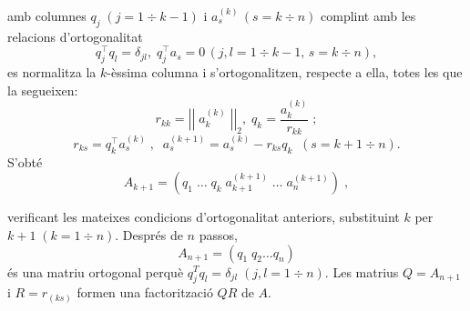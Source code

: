 \documentclass{article}
\begin{document}
amb columnes $q_{j}\;\left(j = 1 \div k - 1  \right)$ i $a_{s}^{(k)}\, \left(s = k \div n \right)$ complint amb les relacions d'ortogonalitat
$$q_{j}^\top q_{l} = \delta_{jl},\; q_{j}^\top a_{s} = 0\, \left(j, l = 1 \div k-1,\, s = k \div n \right),$$
es normalitza la $k$-èssima columna i s'ortogonalitzen, respecte a ella, totes les que la segueixen:
$$r_{kk} = \left| \left|\; a_{k}^{(k)}\; \right| \right|_{2}, \; q_{k} = \frac{a_{k}^{(k)}}{r_{kk}}\;; $$ 
$$r_{ks} = q_{k}^\top a_{s}^{(k)}\; , \; \; a_{s}^{(k+1)} = a_{s}^{(k)} - r_{ks}q_{k} \; \; \left( s = k+1 \div n \right) .$$
S'obté
$$A_{k+1} = \left( q_{1} \; \ldots{} \; q_{k} \; a_{k+1}^{(k+1)} \; \ldots{} \; a_{n}^{(k+1)} \right) \; ,$$

verificant les mateixes condicions d'ortogonalitat anteriors, substituint $k$ per $k+1 \; \left( k = 1 \div n \right).$ \newline
Després de $n$ passos,
$$A_{n+1} = \left(q_{1} \; q_{2} \ldots{} q_{n} \right)$$
és una matriu ortogonal perquè $q_{j}^{T}q_{l} = \delta_{jl} \; \left( j, l = 1 \div n \right).$ \newline
\newline
Les matrius $Q = A_{n+1}$ i $R = r_{(ks)}$ formen una factorització $QR$ de $A$.
\end{document}
